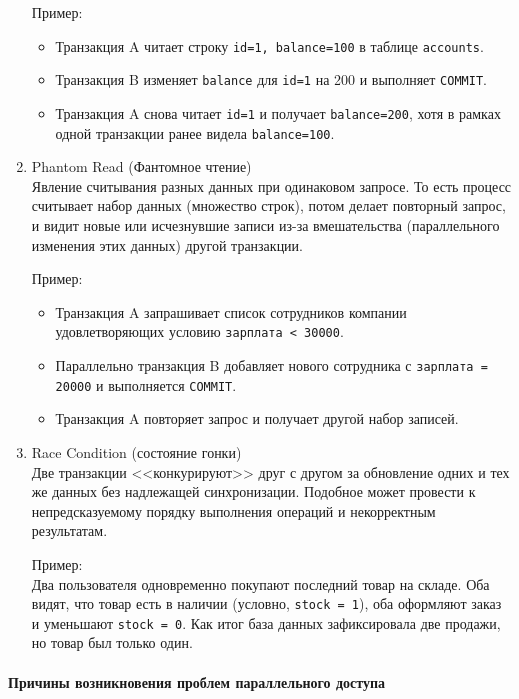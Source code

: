 \begin{enumerate}
    Пример:
    \begin{itemize}
        \item Транзакция A читает строку \texttt{id=1, balance=100} в таблице \texttt{accounts}.
        \item Транзакция B изменяет \texttt{balance} для \texttt{id=1} на 200 и выполняет \texttt{COMMIT}.
        \item Транзакция A снова читает \texttt{id=1} и получает \texttt{balance=200}, хотя в рамках одной транзакции ранее видела \texttt{balance=100}.
    \end{itemize}

    \item Phantom Read (Фантомное чтение) ~\\ 
    Явление считывания разных данных при одинаковом запросе. То есть процесс считывает набор данных (множество строк), потом делает повторный запрос, и видит новые или исчезнувшие записи из-за вмешательства (параллельного изменения этих данных) другой транзакции.

    Пример:
    \begin{itemize}
        \item Транзакция A запрашивает список сотрудников компании удовлетворяющих условию \texttt{зарплата < 30000}.
        \item Параллельно транзакция B добавляет нового сотрудника с \texttt{зарплата = 20000} и выполняется \texttt{COMMIT}.
        \item Транзакция A повторяет запрос и получает другой набор записей.
    \end{itemize}

    \item Race Condition (состояние гонки) ~\\
    Две транзакции <<конкурируют>> друг с другом за обновление одних и тех же данных без надлежащей синхронизации. Подобное может провести к непредсказуемому порядку выполнения операций и некорректным результатам.

    Пример: ~\\
    Два пользователя одновременно покупают последний товар на складе. Оба видят, что товар есть в наличии (условно, \texttt{stock = 1}), оба оформляют заказ и уменьшают \texttt{stock = 0}. Как итог база данных зафиксировала две продажи, но товар был только один.

\end{enumerate}

\paragraph{Причины возникновения проблем параллельного доступа} ~\\

